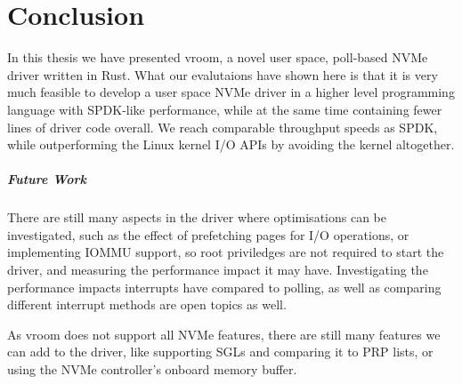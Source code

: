 \chapter{Conclusion}\label{c:c}
In this thesis we have presented vroom, a novel user space, poll-based NVMe driver written in Rust. What our evalutaions have shown here is that it is very much feasible to develop a user space NVMe driver in a higher level programming language with SPDK-like performance, while at the same time containing fewer lines of driver code overall. We reach comparable throughput speeds as SPDK, while outperforming the Linux kernel I/O APIs by avoiding the kernel altogether.

\paragraph{Future Work}
There are still many aspects in the driver where optimisations can be investigated, such as the effect of prefetching pages for I/O operations, or implementing IOMMU support, so root priviledges are not required to start the driver, and measuring the performance impact it may have. Investigating the performance impacts interrupts have compared to polling, as well as comparing different interrupt methods are open topics as well.

As vroom does not support all NVMe features, there are still many features we can add to the driver, like supporting SGLs and comparing it to PRP lists, or using the NVMe controller's onboard memory buffer.
